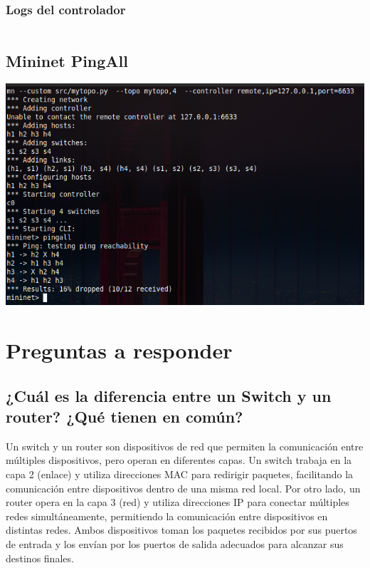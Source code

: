 \documentclass{article}
\begin{document}
\subsubsection{Logs del controlador}
\begin{center}
  \inputminted[fontsize=\footnotesize]{text}{informe/logs/Banned_Tuple_Log.txt}
\end{center}


\subsection{Mininet PingAll}
\begin{center}
  \includegraphics[scale=0.35]{Mininet_Banned_Tupled.png}
\end{center}

\section{Preguntas a responder}\label{preguntas-a-responder}

\subsection{¿Cuál es la diferencia entre un Switch y un router? ¿Qué tienen en común?}
Un switch y un router son dispositivos de red que permiten la comunicación entre múltiples dispositivos, pero operan en diferentes capas. Un switch trabaja en la capa 2 (enlace) y utiliza direcciones MAC para redirigir paquetes, facilitando la comunicación entre dispositivos dentro de una misma red local. Por otro lado, un router opera en la capa 3 (red) y utiliza direcciones IP para conectar múltiples redes simultáneamente, permitiendo la comunicación entre dispositivos en distintas redes. Ambos dispositivos toman los paquetes recibidos por sus puertos de entrada y los envían por los puertos de salida adecuados para alcanzar sus destinos finales.
\end{document}
